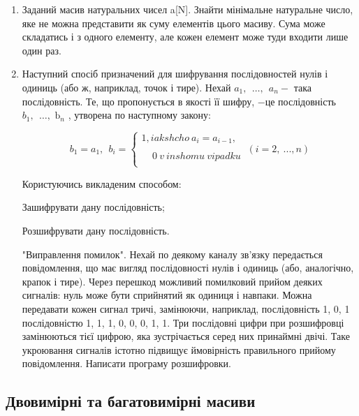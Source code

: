 \documentclass[]{article}
\begin{document}
\begin{enumerate}
\item
Заданий масив натуральних чисел a{[}N{]}. Знайти мінімальне натуральне
число, яке не можна представити як суму елементів цього масиву. Сума
може складатись і з одного елементу, але кожен елемент може туди входити
лише один раз.
\item
Наступний спосіб призначений для шифрування послідовностей нулів і
одиниць (або ж, наприклад, точок і тире). Нехай
\(a_{1},\ \ \ldots,\ \ a_{n} -\) така послідовність. Те, що пропонується
в якості її шифру, \(-\)це послідовність
\(b_{1},\ \ \ldots,\text{\ b}_{n}\) , утворена по наступному закону:


\[b_{1} = a_{1},\ \ b_{i} = \left\{ \begin{matrix}
1,iakshcho\ a_{i} = a_{i - 1}, \\
 \\
\ \ \ \ \ 0\ v\ inshomu\ vipadku \\
\end{matrix} \right.\ \left( i = 2,\ ...,n \right)\]


Користуючись викладеним способом:

Зашифрувати дану послідовність;

Розшифрувати дану послідовність.

"Виправлення помилок". Нехай по деякому каналу зв'язку передається
повідомлення, що має вигляд послідовності нулів і одиниць (або,
аналогічно, крапок і тире). Через перешкод можливий помилковий прийом
деяких сигналів: нуль може бути сприйнятий як одиниця і навпаки. Можна
передавати кожен сигнал тричі, замінюючи, наприклад, послідовність 1, 0,
1 послідовністю 1, 1, 1, 0, 0, 0, 1, 1. Три послідовні цифри при
розшифровці замінюються тієї цифрою, яка зустрічається серед них
принаймні двічі. Таке укроювання сигналів істотно підвищує ймовірність
правильного прийому повідомлення. Написати програму розшифровки.

\end{enumerate}

\subsection{Двовимірні та багатовимірні масиви}
\end{document}
